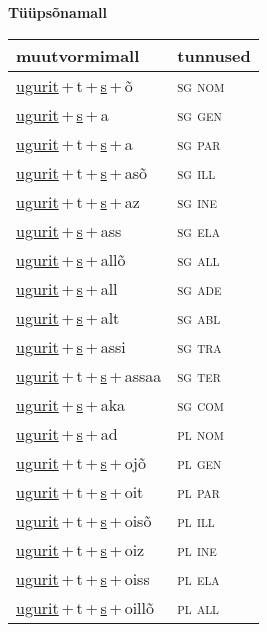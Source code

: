 
\vspace{1.8em}
\begin{minipage}{\textwidth}
\textbf{Tüüpsõnamall \,}\\

\begin{sideways}
\begin{tabular}{l l}
muutvormimall & tunnused \\
\hline
\underline{ugurit}\,+\,t\,+\,\underline{s}\,+\,õ & \textsc{ sg nom } \\
\underline{ugurit}\,+\,\underline{s}\,+\,a & \textsc{ sg gen } \\
\underline{ugurit}\,+\,t\,+\,\underline{s}\,+\,a & \textsc{ sg par } \\
\underline{ugurit}\,+\,t\,+\,\underline{s}\,+\,asõ & \textsc{ sg ill } \\
\underline{ugurit}\,+\,t\,+\,\underline{s}\,+\,az & \textsc{ sg ine } \\
\underline{ugurit}\,+\,\underline{s}\,+\,ass & \textsc{ sg ela } \\
\underline{ugurit}\,+\,\underline{s}\,+\,allõ & \textsc{ sg all } \\
\underline{ugurit}\,+\,\underline{s}\,+\,all & \textsc{ sg ade } \\
\underline{ugurit}\,+\,\underline{s}\,+\,alt & \textsc{ sg abl } \\
\underline{ugurit}\,+\,\underline{s}\,+\,assi & \textsc{ sg tra } \\
\underline{ugurit}\,+\,t\,+\,\underline{s}\,+\,assaa & \textsc{ sg ter } \\
\underline{ugurit}\,+\,\underline{s}\,+\,aka & \textsc{ sg com } \\
\underline{ugurit}\,+\,\underline{s}\,+\,ad & \textsc{ pl nom } \\
\underline{ugurit}\,+\,t\,+\,\underline{s}\,+\,ojõ & \textsc{ pl gen } \\
\underline{ugurit}\,+\,t\,+\,\underline{s}\,+\,oit & \textsc{ pl par } \\
\underline{ugurit}\,+\,t\,+\,\underline{s}\,+\,oisõ & \textsc{ pl ill } \\
\underline{ugurit}\,+\,t\,+\,\underline{s}\,+\,oiz & \textsc{ pl ine } \\
\underline{ugurit}\,+\,t\,+\,\underline{s}\,+\,oiss & \textsc{ pl ela } \\
\underline{ugurit}\,+\,t\,+\,\underline{s}\,+\,oillõ & \textsc{ pl all } \\

\end{tabular}
\end{sideways}
\end{minipage}
